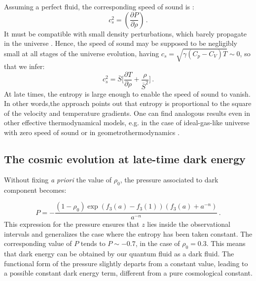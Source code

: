 \documentclass[nofootinbib,prd,superscriptaddress,showpacs,showkeys,]{revtex4}
\begin{document}
Assuming a  perfect fluid,  the corresponding speed of sound is \cite{octo}:
\begin{equation}\label{speedofsound}
c_s^2 = \left(\frac{\partial P}{\partial \rho}\right)\,.
\end{equation}
It must be compatible with small density perturbations, which barely propagate in the universe \cite{sound}. Hence, the speed of sound may be supposed to be negligibly small at all stages of the universe evolution, having $c_s= \sqrt{\gamma (C_p-C_V)T}\sim0$,  so that we infer:
\begin{equation}\label{adyab}
c_s^2=\bar S\Big[\frac{\partial T}{\partial\rho}+\frac{\rho}{\bar{S}^2}\Big]\,.
\end{equation}
At late times,  the entropy is large enough to enable the speed of sound to vanish.  In other words,the approach points out that  entropy is proportional to the square of the
velocity and temperature gradients. One can find analogous results even in other effective thermodynamical models, e.g.  in the case of ideal-gas-like universe with zero speed of sound or in   geometrothermodynamics \cite{dgeometro}.







\subsection{The cosmic evolution at  late-time dark energy}

Without  fixing \emph{a priori} the value of $\rho_0$, the pressure associated to  dark component becomes:

\begin{equation}\label{prex}
P=-\frac{(1-\rho_0)\exp(f_3(a)-f_3(1))(f_3(a)+a^{-n})}{a^{-n}}\,.
\end{equation}
This expression for the pressure ensures that  $z$ lies inside the observational intervals and generalizes the case where the entropy has been taken constant. The corresponding value of $P$ tends to $P\sim -0.7$, in the case of $\rho_0=0.3$. This means that dark energy can  be obtained by our quantum fluid as a dark fluid. The functional form of the pressure slightly departs from a constant value, leading to a possible constant dark energy term, different from a pure cosmological constant.
\end{document}
